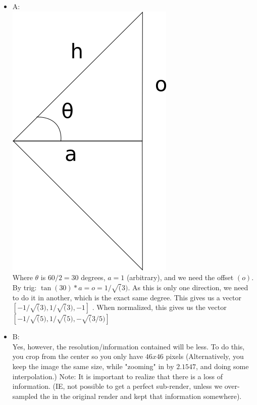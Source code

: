 \begin{itemize}

\item A: \\
\includegraphics[scale=0.33]{fov} \\

Where $\theta$ is $60/2 = 30$ degrees, $a=1$ (arbitrary), and we need the offset $(o)$. By trig: $\tan(30)*a = o = 1/\sqrt(3) $. As this is only one direction, we need to do it in another, which is the exact same degree.
This gives us a vector $[-1/\sqrt(3), 1/\sqrt(3), -1]$ . When normalized, this gives us the vector $[-1/\sqrt(5), 1/\sqrt(5), -\sqrt(3/5)]$

\item B: \\
	Yes, however, the resolution/information contained will be less. To do this, you crop from the center so you only have $46x46$ pixels (Alternatively, you keep the image the same size, while "zooming" in by $2.1547$, and doing some interpolation.) Note: It is important to realize that there is a loss of information. (IE, not possible to get a perfect sub-render, unless we over-sampled the in the original render and kept that information somewhere).

\end{itemize}
